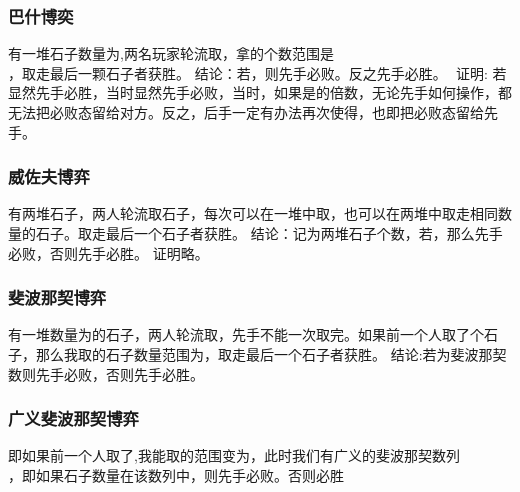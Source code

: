 \documentclass[8pt,a4paper]{article}
\newcommand{\txt}[1]{\par\noindent\footnotesize #1}
\newcommand{\inlineformula}[1]{\ensuremath{}}
\newcommand{\displayformula}[1]{%
    \vspace{0.2em}
    \[
        
    \]
}
\begin{document}
\begin{multicols}{2}
        \subsubsection{巴什博奕}
            \txt{有一堆石子数量为\inlineformula{./assets/formulas_tex/formula_521.tex},两名玩家轮流取，拿的个数范围是\displayformula{./assets/formulas_tex/formula_522.tex}，取走最后一颗石子者获胜。
结论：若\inlineformula{./assets/formulas_tex/formula_523.tex}，则先手必败。反之先手必胜。
\inlineformula{./assets/formulas_tex/formula_524.tex}
证明:
若\inlineformula{./assets/formulas_tex/formula_525.tex}显然先手必胜，当\inlineformula{./assets/formulas_tex/formula_526.tex}时显然先手必败，当\inlineformula{./assets/formulas_tex/formula_527.tex}时，如果\inlineformula{./assets/formulas_tex/formula_528.tex}是\inlineformula{./assets/formulas_tex/formula_529.tex}的倍数，无论先手如何操作，都无法把必败态留给对方。反之，后手一定有办法再次使得\inlineformula{./assets/formulas_tex/formula_530.tex}，也即把必败态留给先手。}
        \subsubsection{威佐夫博弈}
            \txt{有两堆石子，两人轮流取石子，每次可以在一堆中取，也可以在两堆中取走相同数量的石子。取走最后一个石子者获胜。
结论：记\inlineformula{./assets/formulas_tex/formula_531.tex}为两堆石子个数，若\inlineformula{./assets/formulas_tex/formula_532.tex}，那么先手必败，否则先手必胜。
证明略。}
        \subsubsection{斐波那契博弈}
            \txt{有一堆数量为\inlineformula{./assets/formulas_tex/formula_533.tex}的石子，两人轮流取，先手不能一次取完。如果前一个人取了\inlineformula{./assets/formulas_tex/formula_534.tex}个石子，那么我取的石子数量范围为\inlineformula{./assets/formulas_tex/formula_535.tex}，取走最后一个石子者获胜。
结论:若\inlineformula{./assets/formulas_tex/formula_536.tex}为斐波那契数则先手必败，否则先手必胜。}
        \subsubsection{广义斐波那契博弈}
            \txt{即如果前一个人取了\inlineformula{./assets/formulas_tex/formula_537.tex},我能取的范围变为\inlineformula{./assets/formulas_tex/formula_538.tex}，此时我们有广义的斐波那契数列\displayformula{./assets/formulas_tex/formula_539.tex}，即\inlineformula{./assets/formulas_tex/formula_540.tex}如果石子数量在该数列中，则先手必败。否则必胜}

\end{multicols}
\end{document}
